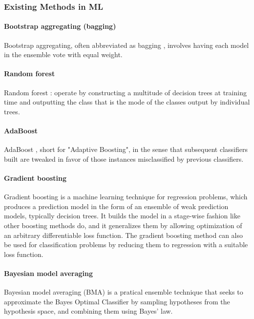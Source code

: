 \subsubsection{Existing Methods in ML}

\paragraph{Bootstrap aggregating (bagging)}
Bootstrap aggregating, often abbreviated as bagging \cite{breiman1996bagging}, involves having each model in the ensemble vote with equal weight.

\paragraph{Random forest}

Random forest \cite{breiman2001random}: operate by constructing a multitude of decision trees at training time and outputting the class that is the mode of the classes output by individual trees. 

\paragraph{AdaBoost}

AdaBoost \cite{freund1997decision}, short for "Adaptive Boosting", in the sense that subsequent classifiers built are tweaked in favor of those instances misclassified by previous classifiers. 

\paragraph{Gradient boosting}
\label{sec:ml:GradientBoosting}
Gradient boosting \cite{friedman2001greedy} is a machine learning technique for regression problems, which produces a prediction model in the form of an ensemble of weak prediction models, typically decision trees. It builds the model in a stage-wise fashion like other boosting methods do, and it generalizes them by allowing optimization of an arbitrary differentiable loss function. The gradient boosting method can also be used for classification problems by reducing them to regression with a suitable loss function.

\paragraph{Bayesian model averaging}

Bayesian model averaging (BMA) \cite{hoeting1999bayesian}  is a pratical ensemble technique that seeks to approximate the Bayes Optimal Classifier by sampling hypotheses from the hypothesis space, and combining them using Bayes' law.

